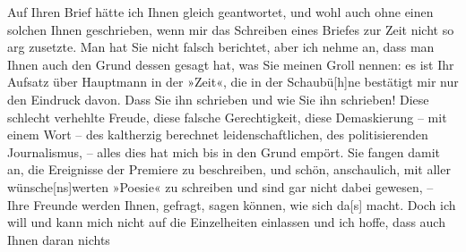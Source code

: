 \pstart
           Auf Ihren Brief hätte ich Ihnen gleich geantwortet, und wohl auch ohne einen solchen
               Ihnen geschrieben, wenn mir das Schreiben eines Briefes zur Zeit nicht so arg
               zusetzte. Man hat Sie nicht falsch berichtet, aber ich nehme an, dass man Ihnen auch
               den Grund dessen gesagt hat, was Sie meinen Groll nennen: es ist Ihr 
               Aufsatz über Hauptmann
                in der »Zeit«, die \label{K_L03438-9v}\label{K_L03438-9} in der Schaubü{[}h{]}ne bestätigt mir nur den
               Eindruck davon. Dass Sie ihn schrieben und wie Sie ihn schrieben! Diese schlecht
               verhehlte Freude, diese falsche Gerechtigkeit, diese Demaskierung – mit einem Wort –
               des kaltherzig berechnet leidenschaftlichen, des politisierenden Journalismus, –
               alles dies hat mich bis in den Grund empört. Sie fangen damit an, die Ereignisse der
                  Premiere zu beschreiben,
               und schön, anschaulich, mit aller wünsche{[}ns{]}werten »Poesie« zu
               schreiben und sind gar nicht dabei gewesen, – Ihre Freunde werden Ihnen, gefragt,
               sagen können, wie sich da{[}s{]} macht. Doch ich will und kann mich
               nicht auf die Einzelheiten einlassen und ich hoffe, dass auch Ihnen daran nichts
